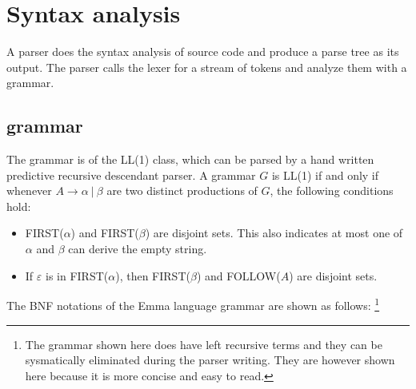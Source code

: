 \documentclass[10pt,a4paper]{article}
\begin{document}
\section{Syntax analysis}
A parser does the syntax analysis of source code and produce a parse tree
as its output. The parser calls the lexer for a stream of tokens and 
analyze them with a grammar.

\subsection{grammar}
The grammar is of the LL(1) class, which can be parsed by a hand written 
predictive recursive descendant parser. 
A grammar $G$ is LL(1) if and only if whenever $A \rightarrow \alpha\ |\ \beta$ 
are two distinct productions of $G$, the following conditions hold:
\begin{itemize}
\item FIRST($\alpha$) and FIRST($\beta$) are disjoint sets. This also indicates
at most one of $\alpha$ and $\beta$ can derive the empty string.
\item If $\varepsilon$ is in FIRST($\alpha$), then FIRST($\beta$) and 
FOLLOW($A$) are disjoint sets.
\end{itemize}

The BNF notations of the Emma language grammar are shown as follows:
\footnote{
The grammar shown here does have left recursive terms and they
can be sysmatically eliminated during the parser writing. They
are however shown here because it is more concise and easy to
read.}
\end{document}
